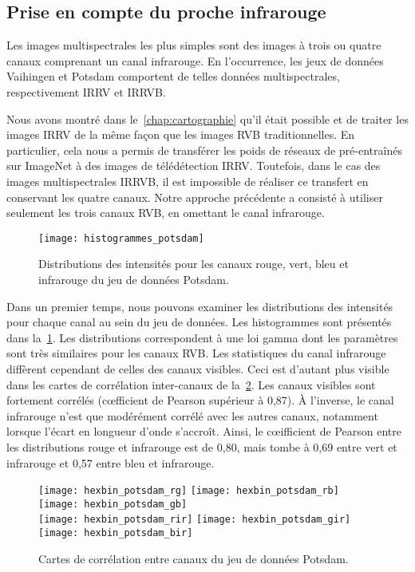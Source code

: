 \subsection{Prise en compte du proche infrarouge}

Les images multispectrales les plus simples sont des images à trois ou quatre canaux comprenant un canal infrarouge. En l'occurrence, les jeux de données  Vaihingen et Potsdam comportent de telles données multispectrales, respectivement \gls{IRRV} et \gls{IRRVB}.

Nous avons montré dans le~\cref{chap:cartographie} qu'il était possible et de traiter les images \gls{IRRV} de la même façon que les images \gls{RVB} traditionnelles. En particulier, cela nous a permis de transférer les poids de réseaux de pré-entraînés sur ImageNet à des images de télédétection \gls{IRRV}. Toutefois, dans le cas des images multispectrales \gls{IRRVB}, il est impossible de réaliser ce transfert en conservant les quatre canaux. Notre approche précédente a consisté à utiliser seulement les trois canaux \gls{RVB}, en omettant le canal infrarouge.

\begin{figure}[h]
  \texttt{[image: histogrammes\_potsdam]}
  \caption{Distributions des intensités pour les canaux rouge, vert, bleu et infrarouge du jeu de données  Potsdam.}
  \label{fig:potsdam_histograms}
\end{figure}

Dans un premier temps, nous pouvons examiner les distributions des intensités pour chaque canal au sein du jeu de données. Les histogrammes sont présentés dans la~\cref{fig:potsdam_histograms}. Les distributions correspondent à une loi gamma dont les paramètres sont très similaires pour les canaux \gls{RVB}. Les statistiques du canal infrarouge diffèrent cependant de celles des canaux visibles. Ceci est d'autant plus visible dans les cartes de corrélation inter-canaux de la~\cref{fig:potsdam_correlations}. Les canaux visibles sont fortement corrélés (c\oe{}fficient de Pearson supérieur à 0,87). À l'inverse, le canal infrarouge n'est que modérément corrélé avec les autres canaux, notamment lorsque l'écart en longueur d'onde s'accroît. Ainsi, le c\oe{}ifficient de Pearson entre les distributions rouge et infrarouge est de 0,80, mais tombe à 0,69 entre vert et infrarouge et 0,57 entre bleu et infrarouge.

\begin{figure}[h]
  \texttt{[image: hexbin\_potsdam\_rg]}
  \texttt{[image: hexbin\_potsdam\_rb]}
  \texttt{[image: hexbin\_potsdam\_gb]}\\
  \texttt{[image: hexbin\_potsdam\_rir]}
  \texttt{[image: hexbin\_potsdam\_gir]}
  \texttt{[image: hexbin\_potsdam\_bir]}
  \caption{Cartes de corrélation entre canaux du jeu de données  Potsdam.}
  \label{fig:potsdam_correlations}
\end{figure}


